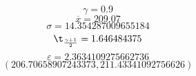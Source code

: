 $$ \gamma = 0.9 $$
$$ \overline{x} = 209.07 $$
$$ \sigma = 14.354287009655184 $$
$$ \t_{\frac{\gamma+1}{2}} = 1.646484375 $$
$$ \varepsilon = 2.3634109275662736 $$
$$ (206.70658907243373, 211.43341092756626) $$
